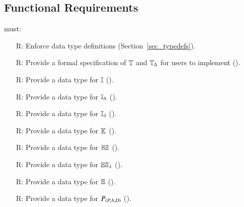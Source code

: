 \subsection{Functional Requirements}\label{sec_functionalreqs}

\progname{} must:
\noindent \begin{itemize}

    \item[R\refstepcounter{reqnum}\thereqnum \label{R_Types}:] Enforce data
    type definitions (Section~\ref{sec_typedefs}).

    \item[R\refstepcounter{reqnum}\thereqnum \label{R_TimeType}:] Provide a
    formal specification of $\mathbb{T}$ and $\mathbb{T}_{\Delta}$ for users to
    implement ().

    \item[R\refstepcounter{reqnum}\thereqnum \label{R_IntensityTypeUse}:]
    Provide a data type for $\mathbb{I}$
    ().

    \item[R\refstepcounter{reqnum}\thereqnum \label{R_IntensityChangeType}:]
    Provide a data type for $\mathbb{I}_{\Delta}$ ().

    \item[R\refstepcounter{reqnum}\thereqnum \label{R_IntensityDecayType}:]
    Provide a data type for $\mathbb{I_{\lambda}}$ ().

    \item[R\refstepcounter{reqnum}\thereqnum \label{R_EmotionKindsType}:]
    Provide a data type for $\mathbb{K}$ ().

    \item[R\refstepcounter{reqnum}\thereqnum \label{R_EmotionStateType}:]
    Provide a data type for $\mathbb{ES}$ ().

    \item[R\refstepcounter{reqnum}\thereqnum \label{R_EmotionDecayStateType}:]
    Provide a data type for $\mathbb{ES}_\lambda$
    ().

    \item[R\refstepcounter{reqnum}\thereqnum \label{R_EmotionType}:] Provide a
    data type for $\mathbb{E}$ ().

    \item[R\refstepcounter{reqnum}\thereqnum \label{R_PADPointType}:] Provide
    a data type for $P_{\left(P,A,D\right)}$ ().


\end{itemize}
